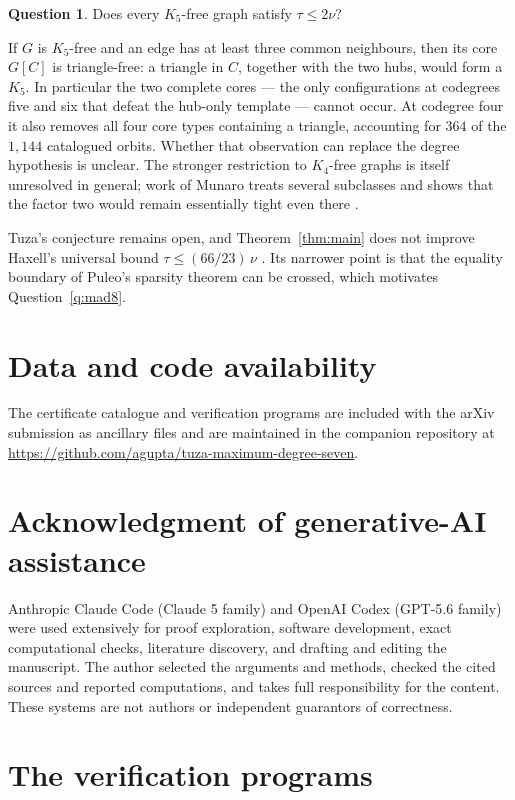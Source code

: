 \documentclass[11pt,a4paper]{amsart}
\theoremstyle{plain}
\theoremstyle{definition}
\newtheorem{question}[theorem]{Question}
\begin{document}
\begin{question}\label{q:k5free}
Does every $K_5$-free graph satisfy $\tau\le2\nu$?
\end{question}

If $G$ is $K_5$-free and an edge has at least three common neighbours, then
its core $G[C]$ is triangle-free: a triangle in $C$, together with the two
hubs, would form a $K_5$. In particular the two complete cores --- the only
configurations at codegrees five and six that defeat the hub-only template ---
cannot occur. At codegree four it also removes all four core types containing
a triangle, accounting for $364$ of the $1{,}144$ catalogued orbits. Whether
that observation can replace the degree hypothesis is unclear. The stronger
restriction to $K_4$-free graphs is itself unresolved in general; work of
Munaro treats several subclasses and shows that the factor two would remain
essentially tight even there \cite{Munaro2018}.

Tuza's conjecture remains open, and Theorem~\ref{thm:main} does not improve
Haxell's universal bound $\tau\le(66/23)\,\nu$ \cite{Haxell1999}. Its narrower
point is that the equality boundary of Puleo's sparsity theorem can be crossed,
which motivates Question~\ref{q:mad8}.

\section*{Data and code availability}
The certificate catalogue and verification programs are included with the
arXiv submission as ancillary files and are maintained in the companion
repository at
\url{https://github.com/agupta/tuza-maximum-degree-seven}.

\section*{Acknowledgment of generative-AI assistance}
Anthropic Claude Code (Claude 5 family) and OpenAI Codex (GPT-5.6 family) were
used extensively for proof exploration, software development, exact
computational checks, literature discovery, and drafting and editing the
manuscript. The author selected the arguments and methods, checked the cited
sources and reported computations, and takes full responsibility for the
content. These systems are not authors or independent guarantors of
correctness.

\appendix

\section{The verification programs}\label{app:programs}
\end{document}
